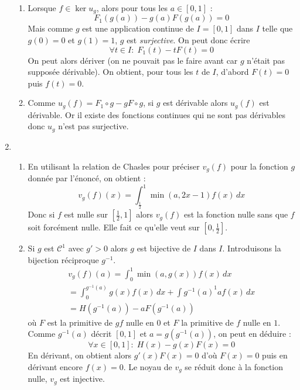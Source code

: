 \begin{enumerate}
\begin{enumerate}
 \item Lorsque $f\in \ker u_g$, alors pour tous les $a\in [0,1]$ :
\begin{displaymath}
 F_1(g(a))-g(a)F(g(a))=0
\end{displaymath}
Mais comme $g$ est une application continue de $I=[0,1]$ dans $I$ telle que $g(0)=0$ et $g(1)=1$, $g$ est \emph{surjective}. On peut donc écrire
\begin{displaymath}
 \forall t\in I :\; F_1(t)-tF(t)=0
\end{displaymath}
On peut alors dériver (on ne pouvait pas le faire avant car $g$ n'était pas supposée dérivable). On obtient, pour tous les $t$ de $I$, d'abord $F(t)=0$ puis $f(t)=0$.

\item Comme $u_g(f)=F_1\circ g -g F\circ g$, si $g$ est dérivable alors $u_g(f)$ est dérivable. Or il existe des fonctions continues qui ne sont pas dérivables donc $u_g$ n'est pas surjective.
\end{enumerate}
\item \begin{enumerate}
 \item En utilisant la relation de Chasles pour préciser $v_g(f)$ pour la fonction $g$ donnée par l'énoncé, on obtient :
\begin{displaymath}
 v_g(f)(x)= \int_{\frac{1}{2}}^{1}\min(a,2x-1)f(x)\,dx
\end{displaymath}
Donc si $f$ est nulle sur $[\frac{1}{2},1]$ alors $v_g(f)$ est la fonction nulle sans que $f$ soit forcément nulle. Elle fait ce qu'elle veut sur $[0,\frac{1}{2}]$.
\item Si $g$ est $\mathcal C ^1$ avec $g'>0$ alors $g$ est bijective de $I$ dans $I$. Introduisons la bijection réciproque $g^{-1}$.
\begin{multline*}
 v_g(f)(a)=\int _0 ^1 \min (a,g(x))f(x)\,dx \\
= \int _0 ^{g^{-1}(a)}g(x)f(x)\,dx + \int {g^{-1}(a)} ^1 a f(x)\,dx \\
= H(g^{-1}(a))- a F(g^{-1}(a))
\end{multline*}
où $F$ est la primitive de $gf$ nulle en $0$ et $F$ la primitive de $f$ nulle en $1$.\newline
Comme $g^{-1}(a)$ décrit $[0,1]$ et $a=g(g^{-1}(a))$, on peut en déduire :
\begin{displaymath}
 \forall x\in [0,1] :\; H(x)-g(x)F(x) = 0
\end{displaymath}
En dérivant, on obtient alors $g'(x)F(x)=0$ d'où $F(x)=0$ puis en dérivant encore $f(x)=0$. Le noyau de $v_g$ se réduit donc à la fonction nulle, $v_g$ est injective.
\end{enumerate}

\end{enumerate}
